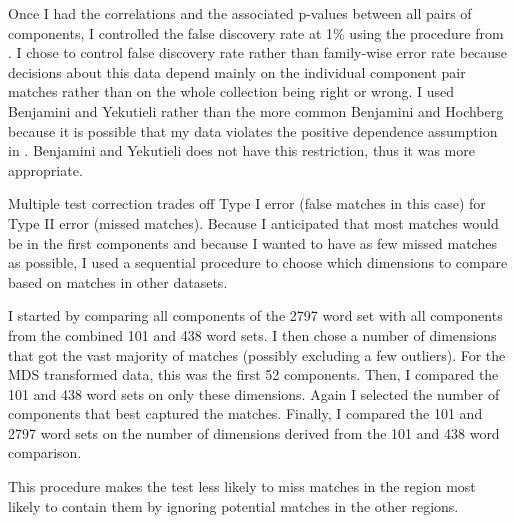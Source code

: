 Once I had the correlations and the associated p-values between all pairs of
components, I controlled the false discovery rate at 1\% using the procedure
from \citep{Benjamini2001}. I chose to control false discovery 
rate rather than
family-wise error rate because decisions about this data depend mainly on the
individual component pair matches rather than on the whole collection being 
right or wrong. I used Benjamini and Yekutieli rather than the more common
Benjamini and Hochberg because it is possible that my data violates the 
positive dependence assumption in 
\citep{Benjamini1995}. Benjamini and Yekutieli does not have this restriction, thus it was
more appropriate.

Multiple test correction trades off Type I error (false matches in this case) 
for Type II error (missed matches). Because I anticipated that most matches
would be in the first components and because I wanted to have as few missed
matches as possible, I used a sequential procedure to choose which dimensions
to compare based on matches in other datasets.

I started by comparing all components of the 2797 word set with all 
components from the combined 101 and 438 word sets. I then chose a number of
dimensions that got the vast majority of matches (possibly excluding a few
outliers). For the MDS transformed data, this was the first 52 components. 
Then, I compared the 101 and 438 word sets on only these dimensions. Again I
selected the number of components that best captured the matches. Finally,
I compared the 101 and 2797 word sets on the number of dimensions derived from
the 101 and 438 word comparison. 

This procedure makes the test less likely to miss matches in the region most
likely to contain them by ignoring potential matches in the other regions.
